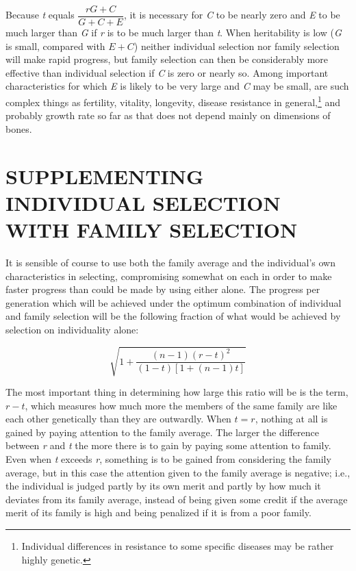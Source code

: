 Because \textit{t} equals $\dfrac{rG + C}{G + C + E}$, it is necessary for
\textit{C} to be nearly zero and \textit{E} to be much larger than \textit{G}
if \textit{r} is to be much larger than \textit{t}. When heritability is low
(\textit{G} is small, compared with $E + C$) neither
individual selection nor family selection will make rapid progress, but
family selection can then be considerably more effective than individual
selection if \textit{C} is zero or nearly so. Among important characteristics for
which \textit{E} is likely to be very large and \textit{C} may be small, are such complex
things as fertility, vitality, longevity, disease resistance in general,\footnote{Individual 
differences in resistance to some specific diseases may be rather highly genetic.} and
probably growth rate so far as that does not depend mainly on dimensions
of bones.

\section*{SUPPLEMENTING INDIVIDUAL SELECTION WITH FAMILY SELECTION}

It is sensible of course to use both the family average and the individual's
own characteristics in selecting, compromising somewhat on
each in order to make faster progress than could be made by using
either alone. The progress per generation which will be achieved under
the optimum combination of individual and family selection will be
the following fraction of what would be achieved by selection on individuality
alone:

\[ \sqrt{1 + \frac{(n - 1)(r - t)^2}{(1 - t)[1 + (n - 1)t]}} \]

The most important thing in determining how large this ratio will
be is the term, $r - t$, which measures how much more the members of
the same family are like each other genetically than they are outwardly.
When $t = r$, nothing at all is gained by paying attention to the family
average. The larger the difference between \textit{r} and \textit{t} the more there is to
gain by paying some attention to family. Even when \textit{t} exceeds \textit{r}, something
is to be gained from considering the family average, but in this
case the attention given to the family average is negative; i.e., the individual
is judged partly by its own merit and partly by how much it
deviates from its family average, instead of being given some credit if
the average merit of its family is high and being penalized if it is from a
poor family.

